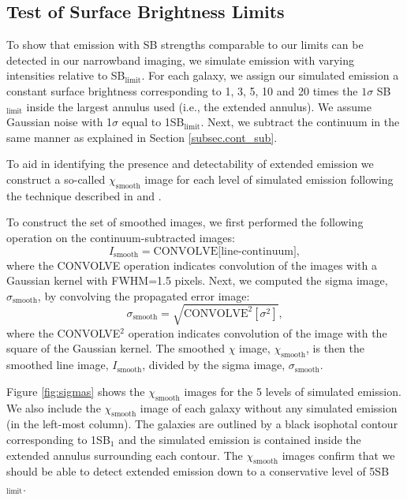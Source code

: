 \documentclass[twocolumn]{aastex62}
\begin{document}
\subsection{Test of Surface Brightness Limits}\label{subsec:test}
To show that  emission with SB strengths comparable to our limits can be detected in our narrowband imaging, we simulate emission with varying intensities relative to SB$_{\text{limit}}$. For each galaxy, we assign our simulated emission a constant surface brightness corresponding to 1, 3, 5, 10 and 20 times the $1\sigma$ SB$_{\text{limit}}$ inside the largest annulus used (i.e., the extended annulus). We assume Gaussian noise with 1$\sigma$ equal to 1SB$_{\text{limit}}$. Next, we subtract the continuum in the same manner as explained in Section \ref{subsec.cont_sub}. 

To aid in identifying the presence and detectability of extended  emission we construct a so-called $\chi_{\text{smooth}}$ image for each level of simulated emission following the technique described in \cite{Hennawi2013} and \cite{Battaia_2015}.

To construct the set of smoothed images, we first performed the following operation on the continuum-subtracted images:
\begin{equation}
I_{\text{smooth}}= \text{CONVOLVE[line-continuum]},
\end{equation}
where the CONVOLVE operation indicates convolution of the  images with a Gaussian kernel with FWHM=1.5 pixels. Next, we computed the sigma image, $\sigma_{\text{smooth}}$, by convolving the propagated error image:
\begin{equation}
\sigma_{\text{smooth}}=\sqrt{\text{CONVOLVE}^2[\sigma^2]},
\end{equation}
where the CONVOLVE$^2$ operation indicates convolution of the image with the square of the Gaussian kernel. The smoothed $\chi$ image, $\chi_{\text{smooth}}$, is then 
the smoothed line image, $I_{\text{smooth}}$, divided by the sigma image, $\sigma_{\text{smooth}}$.

Figure \ref{fig:sigmas} shows the $\chi_{\text{smooth}}$ images for the 5 levels of simulated  emission. We also include the $\chi_{\text{smooth}}$ image of each galaxy without any simulated emission (in the left-most column). The galaxies are outlined by a black isophotal contour corresponding to 1SB$_1$ and the simulated emission is contained inside the extended annulus surrounding each contour. The  $\chi_{\text{smooth}}$ images confirm that we should be able to detect extended  emission down to a conservative level of 5SB$_{\text{limit}}$. 
\end{document}
